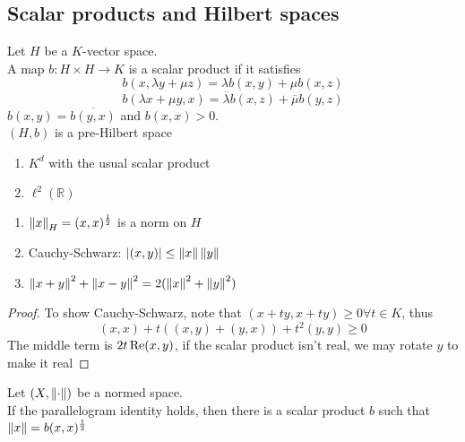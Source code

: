 \documentclass[../main.tex]{subfiles}
\begin{document}
\subsection{Scalar products and Hilbert spaces}
\begin{defn}
	Let $H$ be a $K$-vector space.\\
	A map $b:H\times H \to K$ is a scalar product if it satisfies
	\[ 
b( x,\lambda y + \mu z) = \lambda b( x,y) + \mu b( x,z) 	
	\]
	\[ 
		b( \lambda x + \mu y,x) = \overline{\lambda} b( x,z) + \overline{\mu} b( y,z) 	
	\]
	$b( x,y) = \overline{b( y,x) }$ and $b( x,x) >0$.\\
	$( H,b) $ is a pre-Hilbert space
\end{defn}
\begin{exemple}
	\begin{enumerate}
	\item $K^{d}$ with the usual scalar product\\
	\item $\ell^{2}( \mathbb{R}) $ 
	\end{enumerate}
\end{exemple}
\begin{propo}
\begin{enumerate}
	\item $\left\lVert x\right\rVert_H = ( x,x)^{\frac{1}{2}}$ is a norm on $H$ 
	\item Cauchy-Schwarz: $|( x,y)| \leq \left\lVert x\right\rVert \left\lVert y\right\rVert$ 
	\item $\left\lVert x+y\right\rVert^{2}+ \left\lVert x-y\right\rVert^{2} = 2( \left\lVert x\right\rVert^{2}+ \left\lVert y\right\rVert^{2}) $ 
\end{enumerate}
\end{propo}
\begin{proof}
To show Cauchy-Schwarz, note that $( x+ty,x+ty) \geq 0\forall t \in K$, thus
\[ 
	( x,x) + t( ( x,y) + ( y,x) ) + t^{2}( y,y) \geq 0
\]
The middle term is $2 t \operatorname{Re}( x,y) $, if the scalar product isn't real, we may rotate $y$ to make it real

\end{proof}
\begin{propo}
	Let $( X,\left\lVert\cdot\right\rVert) $ be a normed space.\\
	If the parallelogram identity holds, then there is a scalar product $b$ such that $\left\lVert x\right\rVert = b( x,x)^{\frac{1}{2}}$ 
\end{propo}
\end{document}
